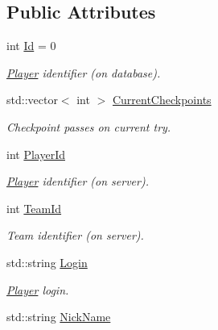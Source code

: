 \subsection*{Public Attributes}
\begin{DoxyCompactItemize}
\item 
\hypertarget{structPlayer_a27cd3355e96dc3842d4f91b859673e0c}{int \hyperlink{structPlayer_a27cd3355e96dc3842d4f91b859673e0c}{Id} = 0}\label{structPlayer_a27cd3355e96dc3842d4f91b859673e0c}

\begin{DoxyCompactList}\small\item\em \hyperlink{structPlayer}{Player} identifier (on database). \end{DoxyCompactList}\item 
\hypertarget{structPlayer_aa6efdb36b3a3618f26bf85c3a9b216d8}{std\-::vector$<$ int $>$ \hyperlink{structPlayer_aa6efdb36b3a3618f26bf85c3a9b216d8}{Current\-Checkpoints}}\label{structPlayer_aa6efdb36b3a3618f26bf85c3a9b216d8}

\begin{DoxyCompactList}\small\item\em Checkpoint passes on current try. \end{DoxyCompactList}\item 
\hypertarget{structPlayer_a6a71d7d9837a0a12e52ca47930965e0f}{int \hyperlink{structPlayer_a6a71d7d9837a0a12e52ca47930965e0f}{Player\-Id}}\label{structPlayer_a6a71d7d9837a0a12e52ca47930965e0f}

\begin{DoxyCompactList}\small\item\em \hyperlink{structPlayer}{Player} identifier (on server). \end{DoxyCompactList}\item 
\hypertarget{structPlayer_a350919664ba73d6d6cd6d03bd2a5cacd}{int \hyperlink{structPlayer_a350919664ba73d6d6cd6d03bd2a5cacd}{Team\-Id}}\label{structPlayer_a350919664ba73d6d6cd6d03bd2a5cacd}

\begin{DoxyCompactList}\small\item\em Team identifier (on server). \end{DoxyCompactList}\item 
\hypertarget{structPlayer_a38398818d43e186aa982a788744792d7}{std\-::string \hyperlink{structPlayer_a38398818d43e186aa982a788744792d7}{Login}}\label{structPlayer_a38398818d43e186aa982a788744792d7}

\begin{DoxyCompactList}\small\item\em \hyperlink{structPlayer}{Player} login. \end{DoxyCompactList}\item 
\hypertarget{structPlayer_a553cc1b0aa79108b511ba408210582cf}{std\-::string \hyperlink{structPlayer_a553cc1b0aa79108b511ba408210582cf}{Nick\-Name}}\label{structPlayer_a553cc1b0aa79108b511ba408210582cf}


\end{DoxyCompactItemize}
